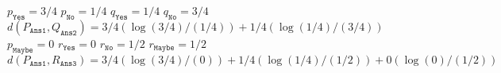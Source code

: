 \documentclass{article}
\begin{document}
\begin{center}
\begin{algorithmic}[1]
\State $p_{\texttt{Yes}} = 3/4$
\State $p_{\texttt{No}} = 1/4$
\State $q_{\texttt{Yes}} = 1/4$
\State $q_{\texttt{No}} = 3/4$
\State $d(P_{\texttt{Ans1}}, Q_{\texttt{Ans2}}) = 3/4(\log(3/4)/(1/4)) + 1/4(\log(1/4)/(3/4))$
\State $p_{\texttt{Maybe}} = 0$
\State $r_{\texttt{Yes}} = 0$
\State $r_{\texttt{No}} = 1/2$
\State $r_{\texttt{Maybe}} = 1/2$
\State $d(P_{\texttt{Ans1}}, R_{\texttt{Ans3}}) = 3/4(\log(3/4)/(0)) + 1/4(\log(1/4)/(1/2)) + 0(\log(0)/(1/2))$
\end{algorithmic}
\end{center}



 

\end{document}
